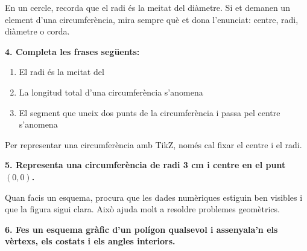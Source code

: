 \documentclass[12pt,a4paper]{article}
\begin{document}
\begin{capsula}
En un cercle, recorda que el radi és la meitat del diàmetre. Si et demanen un element d'una circumferència, mira sempre què et dona l'enunciat: centre, radi, diàmetre o corda.
\end{capsula}

\textbf{4. Completa les frases següents:}
\begin{enumerate}[label=\alph*)]
    \item El radi és la meitat del \dotfill \vspace{0.4cm}
    \item La longitud total d’una circumferència s’anomena \dotfill \vspace{0.4cm}
    \item El segment que uneix dos punts de la circumferència i passa pel centre s’anomena \dotfill \vspace{0.4cm}
\end{enumerate}

\begin{capsula}
Per representar una circumferència amb TikZ, només cal fixar el centre i el radi.
\end{capsula}

\textbf{5. Representa una circumferència de radi 3 cm i centre en el punt $(0,0)$.}

\begin{center}
\end{center}

\begin{capsula}
Quan facis un esquema, procura que les dades numèriques estiguin ben visibles i que la figura sigui clara. Això ajuda molt a resoldre problemes geomètrics.
\end{capsula}

\textbf{6. Fes un esquema gràfic d’un polígon qualsevol i assenyala’n els vèrtexs, els costats i els angles interiors.}

\begin{center}
\end{center}
\end{document}
